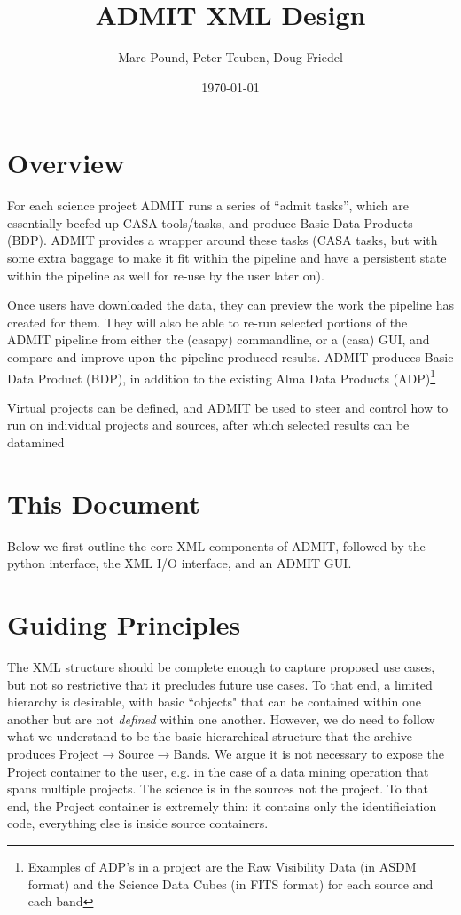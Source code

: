 \documentclass{report}
\title{ADMIT XML Design}
\author{Marc Pound, Peter Teuben, Doug Friedel}
\date{\today}
\begin{document}
\maketitle

\section{Overview}

For each science project ADMIT runs a series of ``admit tasks'', which
are essentially beefed up CASA tools/tasks, and produce Basic Data
Products (BDP).  ADMIT provides a wrapper around these tasks
(CASA tasks, but with some extra baggage to make it fit within the pipeline
and have a persistent state within the pipeline as well for re-use by
the user later on).

Once users have downloaded the data, they can preview the work the pipeline
has created for them. They will also be able to re-run
selected portions of the ADMIT pipeline from either the (casapy)
commandline, or a (casa) GUI, and compare and improve upon the
pipeline produced results. ADMIT produces Basic Data Product (BDP), in
addition to the existing Alma Data Products (ADP)\footnote{Examples of
ADP's in a project are the Raw Visibility Data (in ASDM format) and
the Science Data Cubes (in FITS format) for each source and each
band}

Virtual projects can be defined, and ADMIT be used to steer and control
how to run on individual projects and sources, after which selected
results can be datamined 

\section{This Document}

Below we first outline the core XML components of ADMIT, followed by
the python interface, the XML I/O interface, and an ADMIT GUI.

\section{Guiding Principles}
The XML structure should be complete enough to capture proposed use cases,
but not so restrictive that it precludes future use cases. To that end, a
limited hierarchy is desirable, with basic ``objects" that can be contained
within one another but are not {\it defined} within one another.  However, we
do need to follow what we understand to be the basic hierarchical structure
that the archive produces Project$\rightarrow$Source$\rightarrow$Bands.
We argue it is not necessary to expose the Project container to
the user, e.g. in the case of a data mining operation that spans multiple
projects. The science is in the sources not the project. To that end, the
Project container is extremely thin: it contains only the identificiation
code, everything else is inside source containers.
\end{document}
